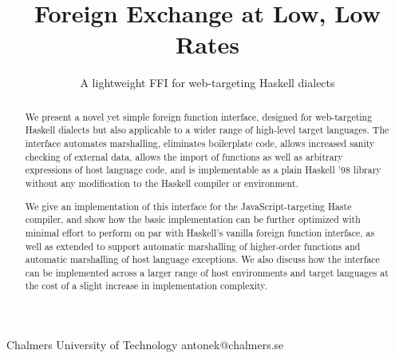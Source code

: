 \documentclass[preprint]{sigplanconf}
\begin{document}
\setlength{\pdfpageheight}{\paperheight}
\setlength{\pdfpagewidth}{\paperwidth}

\exclusivelicense
{} 





\title{Foreign Exchange at Low, Low Rates}
\subtitle{A lightweight FFI for web-targeting Haskell dialects}

           {Chalmers University of Technology}
           {antonek@chalmers.se}

\maketitle

\begin{abstract}
  We present a novel yet simple foreign function interface, designed for
  web-targeting Haskell dialects but also applicable to a wider range of
  high-level target languages.
  The interface automates marshalling, eliminates boilerplate
  code, allows increased sanity checking of external data,
  allows the import of functions as well as arbitrary expressions of host
  language code, and is implementable as a plain Haskell '98 library
  without any modification to the Haskell compiler or environment.
  
  We give an implementation of this interface for the JavaScript-targeting
  Haste compiler, and show how the basic implementation can be
  further optimized with minimal effort to perform on par with Haskell's
  vanilla foreign function interface, as well as extended to support automatic
  marshalling of higher-order functions and automatic marshalling of host
  language exceptions.
  We also discuss how the interface can be implemented across a larger range
  of host environments and target languages at the cost of a slight increase in
  implementation complexity.
\end{abstract}
\end{document}
